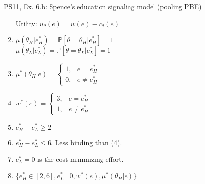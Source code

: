 \begin{frame}{PS11, Ex. 6.b: Spence’s education signaling model (pooling PBE)}
\begin{multicols}{2}
\begin{enumerate}
        \item[Utility:] \vspace{-2pt}$u_\theta(e)=w(e)-c_\theta(e)$
        \item $\mu\left(\theta_H|e_H^*\right)=
               \mathbb{P}\left[\theta=\theta_H|e_H^*\right]=1$\\
              $\mu\left(\theta_L|e_L^*\right)=
               \mathbb{P}\left[\theta=\theta_L|e_L^*\right]=1$
        \item $\mu^*(\theta_H|e)=\left\{\begin{array}{ll}
                  1, & e = e_H^* \\
                  0, & e \neq e_H^*
               \end{array}\right.$
        \item $w^*(e)=\left\{\begin{array}{ll}
                  3, & e = e_H^* \\
                  1, & e \neq e_H^*
               \end{array}\right.$
        \item $e_H^*-e_L^*\geq2$
        \item $e_H^*-e_L^*\leq6$. Less binding than (4).
        \item $e_L^*=0$ is the cost-minimizing effort.
        \item $\{e_H^*\in[2,6],e_L^*$=$0,w^*(e),\mu^*(\theta_H|e)\}$
      \end{enumerate}
    \end{multicols}
    \vfill\null
\end{frame}
